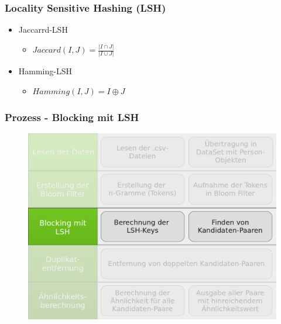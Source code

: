 \documentclass{beamer}
\begin{document}
    \begin{frame}
        \frametitle{Locality Sensitive Hashing (LSH)}
       
            \begin{itemize}
                \item Jaccarrd-LSH
                    \begin{itemize}
                        \item $Jaccard(I,J) = \frac{|I \cap J|}{|I \cup J|}$
                    \end{itemize}
                \item Hamming-LSH
                    \begin{itemize}
                        \item $Hamming(I,J) = I \oplus J$
                    \end{itemize}
            \end{itemize}

    \end{frame}

    \begin{frame}
    		\frametitle{Prozess - Blocking mit LSH}
    		\begin{figure}[H]
    			\includegraphics[width=\textwidth]{graphics/process_3.png}
    		\end{figure}
    \end{frame}
    
\end{document}

